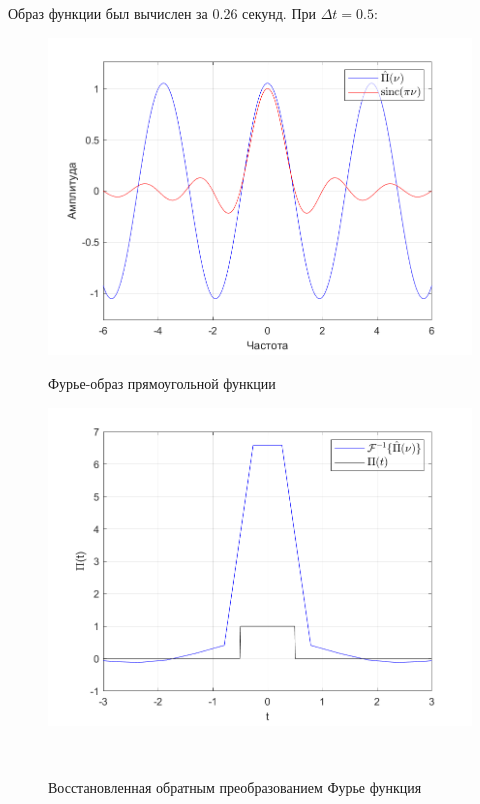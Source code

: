 \documentclass[a4paper]{article}
\begin{document}
Образ функции был вычислен за 0.26 секунд. При $\Delta t = 0.5$:

\begin{figure}[H]
    \begin{minipage}{0.5\textwidth}
        \centering \includegraphics[width=\textwidth]{graphs/1/T_10_dt_0.5_V_12_dv_0.001/fourier_numerical.png}
        \caption{Фурье-образ прямоугольной функции}
    \end{minipage}\hfill
    \begin{minipage}{0.5\textwidth}
        \centering \includegraphics[width=\textwidth]{graphs/1/T_10_dt_0.5_V_12_dv_0.001/func_inversed_fourier.png}
        \caption{Восстановленная обратным преобразованием Фурье функция}
    \end{minipage}\\[1em]
\end{figure}\noindent\
\end{document}
